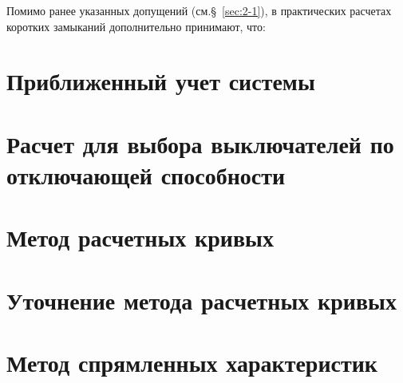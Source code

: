Помимо ранее указанных допущений (см.§~\ref{sec:2-1}), в практических расчетах коротких замыканий дополнительно принимают, что:


\section{Приближенный учет системы}
\label{sec:10-2}


\section{Расчет для выбора выключателей по отключающей способности}
\label{sec:10-3}


\section{Метод расчетных кривых}
\label{sec:10-4}


\section{Уточнение метода расчетных кривых}
\label{sec:10-5}


\section{Метод спрямленных характеристик}
\label{sec:10-6}